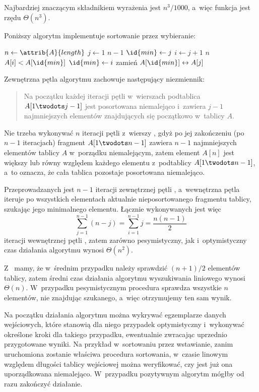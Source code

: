 
\exercise %
Najbardziej znaczącym składnikiem wyrażenia jest $n^3\!/1000$, a~więc funkcja jest rzędu $\Theta(n^3)$.

\exercise %
Poniższy algorytm implementuje sortowanie przez wybieranie:
\begin{codebox}
\li	$n\gets\attrib{A}{length}$
\li	\For $j\gets1$ \To $n-1$ \label{li:selection-sort-for-begin}
\li		\Do $\id{min}\gets j$
\li			\For $i\gets j+1$ \To $n$
\li				\Do \If $A[i]<A[\id{min}]$
\li					\Then $\id{min}\gets i$
					\End
				\End
\li			zamień $A[\id{min}]\leftrightarrow A[j]$
		\End \label{li:selection-sort-for-end}
\end{codebox}
Zewnętrzna pętla algorytmu zachowuje następujący niezmiennik:
\begin{quote}
Na początku każdej iteracji pętli  w~wierszach \doubledash{\ref{li:selection-sort-for-begin}}{\ref{li:selection-sort-for-end}} podtablica $A[1\twodots j-1]$ jest posortowana niemalejąco i~zawiera $j-1$ najmniejszych elementów znajdujących się początkowo w~tablicy $A$.
\end{quote}

Nie trzeba wykonywać $n$ iteracji pętli  z~wierszy \doubledash{\ref{li:selection-sort-for-begin}}{\ref{li:selection-sort-for-end}}, gdyż po jej zakończeniu (po $n-1$ iteracjach) fragment $A[1\twodots n-1]$ zawiera $n-1$ najmniejszych elementów tablicy $A$ w~porządku niemalejącym, zatem element $A[n]$ jest większy lub równy względem każdego elementu z~podtablicy $A[1\twodots n-1]$, a~to oznacza, że cała tablica pozostaje posortowana niemalejąco.

Przeprowadzanych jest $n-1$ iteracji zewnętrznej pętli , a~wewnętrzna pętla  iteruje po wszystkich elementach aktualnie nieposortowanego fragmentu tablicy, szukając jego minimalnego elementu.
Łącznie wykonywanych jest więc
\[
	\sum_{j=1}^{n-1}(n-j) = \sum_{i=1}^{n-1}j = \frac{n(n-1)}{2}
\]
iteracji wewnętrznej pętli , zatem zarówno pesymistyczny, jak i~optymistyczny czas działania algorytmu wynosi $\Theta(n^2)$.

\exercise %
Z~ mamy, że w~średnim przypadku należy sprawdzić $(n+1)/2$ elementów tablicy, zatem średni czas działania algorytmu wyszukiwania liniowego wynosi $\Theta(n)$.
W~przypadku pesymistycznym procedura sprawdza wszystkie $n$ elementów, nie znajdując szukanego, a~więc otrzymujemy ten sam wynik.

\exercise %
Na początku działania algorytmu można wykrywać egzemplarze danych wejściowych, które stanowią dla niego przypadek optymistyczny i~wykonywać określone kroki dla takiego przypadku, ewentualnie zwracając uprzednio przygotowane wyniki.
Na przykład w~sortowaniu przez wstawianie, zanim uruchomiona zostanie właściwa procedura sortowania, w~czasie linowym względem długości tablicy wejściowej można weryfikować, czy jest już ona uporządkowana niemalejąco.
W~przypadku pozytywnym algorytm mógłby od razu zakończyć działanie.

